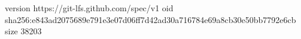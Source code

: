 version https://git-lfs.github.com/spec/v1
oid sha256:e843ad2075689e791e3e07d06ff7d42ad30a716784e69a8cb30e50bb7792e6cb
size 38203

